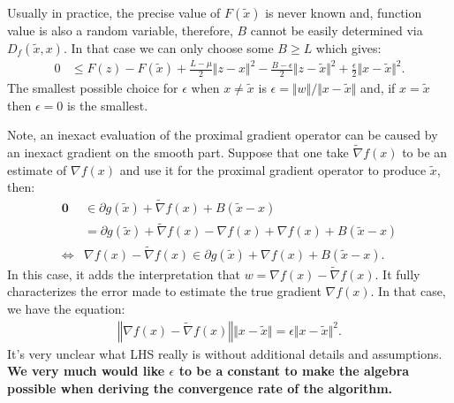 \documentclass[12pt]{article}
\begin{document}
        \begin{remark}
            Usually in practice, the precise value of $F(\tilde x)$ is never known and, function value is also a random variable, therefore, $B$ cannot be easily determined via $D_f(\tilde x, x)$. 
            In that case we can only choose some $B \ge L$ which gives: 
            \begin{align*}
                0 &\le 
                F(z) - F(\tilde x) + \frac{L - \mu}{2}\Vert z - x\Vert^2
                - \frac{B - \epsilon}{2}\Vert z - \tilde x\Vert^2
                + \frac{\epsilon}{2}\Vert x - \tilde x \Vert^2.
            \end{align*}
            The smallest possible choice for $\epsilon$ when $x \neq \tilde x$ is $\epsilon = \Vert w\Vert/\Vert x - \tilde x\Vert$ and, if $x = \tilde x$ then $\epsilon = 0$ is the smallest. 
        \end{remark}
        Note, an inexact evaluation of the proximal gradient operator can be caused by an inexact gradient on the smooth part. 
        Suppose that one take $\tilde \nabla f(x)$ to be an estimate of $\nabla f(x)$ and use it for the proximal gradient operator to produce $\tilde x$, then: 
        \begin{align}
            \mathbf 0 
            &\in \partial g(\tilde x) + \tilde \nabla f(x) + B(\tilde x - x)
            \\
            &= 
            \partial g(\tilde x) + \tilde\nabla f(x) - \nabla f(x) 
            + \nabla f(x) + B(\tilde x - x)
            \\
            \iff &
            \nabla f(x) - \tilde \nabla f(x) \in 
            \partial g(\tilde x) 
            + \nabla f(x) + B(\tilde x - x).\label{eqn:stoch-grad-err-vec}
        \end{align}
        In this case, it adds the interpretation that $w = \nabla f(x) - \tilde \nabla f(x)$. 
        It fully characterizes the error made to estimate the true gradient $\nabla f(x)$. 
        In that case, we have the equation: 
        \begin{align*}
            \left\Vert \nabla f(x) - \tilde \nabla f(x) \right\Vert \Vert x - \tilde x\Vert
            = \epsilon \Vert x - \tilde x\Vert^2. 
        \end{align*}
        It's very unclear what LHS really is without additional details and assumptions. 
        \textbf{We very much would like $\epsilon$ to be a constant to make the algebra possible when deriving the convergence rate of the algorithm. }
\end{document}
